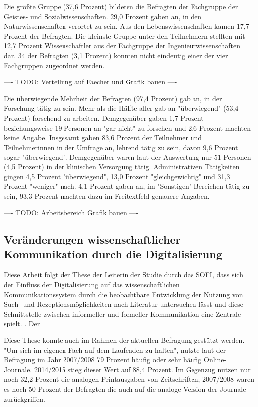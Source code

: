 Die größte Gruppe (37,6 Prozent) bildeten die Befragten der Fachgruppe der Geistes- und Sozialwissenschaften. 29,0 Prozent gaben an, in den Naturwissenschaften verortet zu sein. Aus den Lebenswissenschaften kamen 17,7 Prozent der Befragten. Die kleinste Gruppe unter den Teilnehmern stellten mit 12,7 Prozent Wissenschaftler aus der Fachgruppe der Ingenieurwissenschaften dar. 34 der Befragten (3,1 Prozent) konnten nicht eindeutig einer der vier Fachgruppen zugeordnet werden.


---- TODO: Verteilung auf Faecher und Grafik bauen ----

Die überwiegende Mehrheit der Befragten (97,4 Prozent) gab an, in der Forschung tätig zu sein. Mehr als die Hälfte aller gab an "überwiegend" (53,4 Prozent) forschend zu arbeiten. Demgegenüber gaben 1,7 Prozent beziehungsweise 19 Personen an "gar nicht" zu forschen und 2,6 Prozent machten keine Angabe. Insgesamt gaben 83,6 Prozent der Teilnehmer und Teilnehmerinnen in der Umfrage an, lehrend tätig zu sein, davon 9,6 Prozent sogar "überwiegend". Demgegenüber waren laut der Auswertung nur 51 Personen (4,5 Prozent) in der klinischen Versorgung tätig. Administrativen Tätigkeiten gingen 4,5 Prozent "überwiegend", 13,0 Prozent "gleichgewichtig" und 31,3 Prozent "weniger" nach. 4,1 Prozent gaben an, im "Sonstigen" Bereichen tätig zu sein, 93,3 Prozent machten dazu im Freitextfeld genauere Angaben.


---- TODO: Arbeitsbereich Grafik bauen ----

\subsection{Veränderungen wissenschaftlicher Kommunikation durch die Digitalisierung}

Diese Arbeit folgt der These der Leiterin der Studie durch das SOFI, dass sich der Einfluss der Digitalisierung auf das wissenschaftlichen Kommunikationssystem  durch die beobachtbare Entwicklung der Nutzung von Such- und Rezeptionsmöglichkeiten nach Literatur untersuchen lässt und diese Schnittstelle zwischen informeller und formeller Kommunikation eine Zentrale spielt. \cite{Hanekop_2014}. Der

Diese These konnte auch im Rahmen der aktuellen Befragung gestützt werden. "Um sich im eigenen Fach auf dem Laufenden zu halten", nutzte laut der Befragung im Jahr 2007/2008 79 Prozent häufig oder sehr häufig Online-Journale. 2014/2015 stieg dieser Wert auf 88,4 Prozent. Im Gegenzug nutzen nur noch 32,2 Prozent die analogen Printausgaben von Zeitschriften, 2007/2008 waren es noch 50 Prozent der Befragten die auch auf die analoge Version der Journale zurückgriffen.


